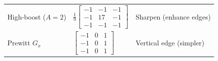 \documentclass[10pt]{article}
\begin{document}
\begin{center}
\begin{tcolorbox}[colback=white, colframe=USC_Congaree, title=\textbf{Quick Reference: Common 3$\times$3 Filters}, sharp corners, colbacktitle=USC_Congaree, coltitle=white]
\begin{tabular}{@{}p{3.5cm}p{4cm}p{6cm}@{}}
High-boost ($A=2$) & $\frac{1}{9}\begin{bmatrix} -1 & -1 & -1 \\ -1 & 17 & -1 \\ -1 & -1 & -1 \end{bmatrix}$ & Sharpen (enhance edges) \\[1.5em]
Prewitt $G_x$ & $\begin{bmatrix} -1 & 0 & 1 \\ -1 & 0 & 1 \\ -1 & 0 & 1 \end{bmatrix}$ & Vertical edge (simpler) \\
\bottomrule
\end{tabular}

\end{tcolorbox}
\end{center}
\end{document}
